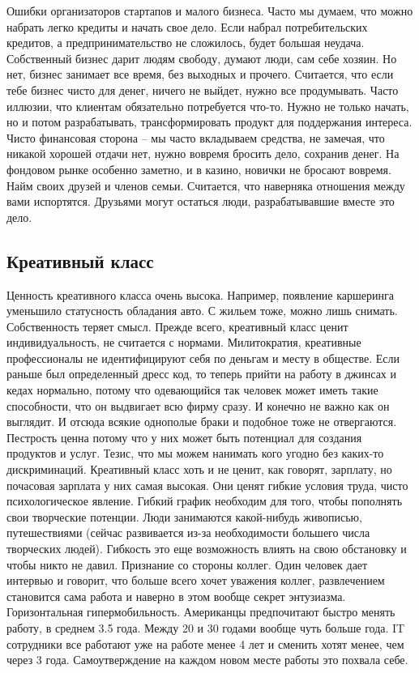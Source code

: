 \documentclass[a4paper, 12pt]{article}
\begin{document}
Ошибки организаторов стартапов и малого бизнеса. Часто мы думаем, что можно набрать легко кредиты и начать свое дело. Если набрал потребительских кредитов, а предпринимательство не сложилось, будет большая неудача. Собственный бизнес дарит людям свободу, думают люди, сам себе хозяин. Но нет, бизнес занимает все время, без выходных и прочего. Считается, что если тебе бизнес чисто для денег, ничего не выйдет, нужно все продумывать. Часто иллюзии, что клиентам обязательно потребуется что-то. Нужно не только начать, но и потом разрабатывать, трансформировать продукт для поддержания интереса. Чисто финансовая сторона -- мы часто вкладываем средства, не замечая, что никакой хорошей отдачи нет, нужно вовремя бросить дело, сохранив денег. На фондовом рынке особенно заметно, и в казино, новички не бросают вовремя. Найм своих друзей и членов семьи. Считается, что наверняка отношения между вами испортятся. Друзьями могут остаться люди, разрабатывавшие вместе это дело. 


\subsection{Креативный класс}

Ценность креативного класса очень высока. Например, появление каршеринга уменьшило статусность обладания авто. С жильем тоже, можно лишь снимать. Собственность теряет смысл. Прежде всего, креативный класс ценит индивидуальность, не считается с нормами. Милитократия, креативные профессионалы не идентифицируют себя по деньгам и месту в обществе. Если раньше был определенный дресс код, то теперь прийти на работу в джинсах и кедах нормально, потому что одевающийся так человек может иметь такие способности, что он выдвигает всю фирму сразу. И конечно не важно как он выглядит. И отсюда всякие однополые браки и подобное тоже не отвергаются. Пестрость ценна потому что у них может быть потенциал для создания продуктов и услуг. Тезис, что мы можем нанимать кого угодно без каких-то дискриминаций. Креативный класс хоть и не ценит, как говорят, зарплату, но почасовая зарплата у них самая высокая. Они ценят гибкие условия труда, чисто психологическое явление. Гибкий график необходим для того, чтобы пополнять свои творческие потенции. Люди занимаются какой-нибудь живописью, путешествиями (сейчас развивается из-за необходимости большего числа творческих людей). Гибкость это еще возможность влиять на свою обстановку и чтобы никто не давил. Признание со стороны коллег. Один человек дает интервью и говорит, что больше всего хочет уважения коллег, развлечением становится сама работа и наверно в этом вообще секрет энтузиазма. Горизонтальная гипермобильность. Американцы предпочитают быстро менять работу, в среднем 3.5 года. Между 20 и 30 годами вообще чуть больше года. IT сотрудники все работают уже на работе менее 4 лет и сменить хотят менее, чем через 3 года. Самоутверждение на каждом новом месте работы это похвала себе. 
\end{document}
